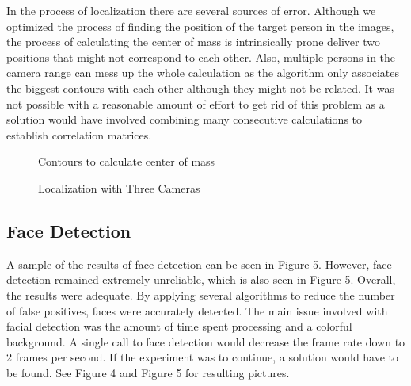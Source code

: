 \documentclass{acm_proc_article-sp}
\begin{document}
In the process of localization there are several sources of error. Although we optimized the process of finding the position of the target person in the images, the process of calculating the center of mass is intrinsically prone deliver two positions that might not correspond to each other. Also, multiple persons in the camera range can mess up the whole calculation as the algorithm only associates the biggest contours with each other although they might not  be related. It was not possible with a reasonable amount of effort to get rid of this problem as a solution would have involved combining many consecutive calculations to establish correlation matrices.

	\begin{figure}
		\centering
		\hfill
		\caption{\label{fig:contour}Contours to calculate center of mass}
	\end{figure}

	\begin{figure}
		\centering
		\hfill
		\caption{\label{fig:localization}Localization with Three Cameras}
	\end{figure}

\subsection{Face Detection}
A sample of the results of face detection can be seen in Figure 5.  However, face detection remained extremely unreliable, which is also seen in Figure 5.
Overall, the results were adequate.  By applying several algorithms to reduce the number of false positives, faces were accurately detected.  The main issue
involved with facial detection was the amount of time spent processing and a colorful background.  A single call to face detection would decrease the frame rate
down to 2 frames per second.  If the experiment was to continue, a solution would have to be found.  See Figure 4 and Figure 5 for resulting pictures.
\end{document}
